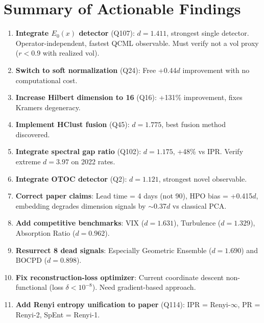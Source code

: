 \documentclass[11pt,a4paper]{article}
\begin{document}
\section{Summary of Actionable Findings}

\begin{enumerate}
\item \textbf{Integrate $E_0(x)$ detector} (Q107): $d=1.411$, strongest single detector. Operator-independent, fastest QCML observable. Must verify not a vol proxy ($r < 0.9$ with realized vol).
\item \textbf{Switch to soft normalization} (Q24): Free +0.44$d$ improvement with no computational cost.
\item \textbf{Increase Hilbert dimension to 16} (Q16): +131\% improvement, fixes Kramers degeneracy.
\item \textbf{Implement HClust fusion} (Q45): $d=1.775$, best fusion method discovered.
\item \textbf{Integrate spectral gap ratio} (Q102): $d=1.175$, +48\% vs IPR. Verify extreme $d=3.97$ on 2022 rates.
\item \textbf{Integrate OTOC detector} (Q2): $d=1.121$, strongest novel observable.
\item \textbf{Correct paper claims}: Lead time = 4 days (not 90), HPO bias = +0.415$d$, embedding degrades dimension signals by $\sim$0.37$d$ vs classical PCA.
\item \textbf{Add competitive benchmarks}: VIX ($d=1.631$), Turbulence ($d=1.329$), Absorption Ratio ($d=0.962$).
\item \textbf{Resurrect 8 dead signals}: Especially Geometric Ensemble ($d=1.690$) and BOCPD ($d=0.898$).
\item \textbf{Fix reconstruction-loss optimizer}: Current coordinate descent non-functional (loss $\delta < 10^{-8}$). Need gradient-based approach.
\item \textbf{Add Renyi entropy unification to paper} (Q114): IPR = Renyi-$\infty$, PR = Renyi-2, SpEnt = Renyi-1.
\end{enumerate}
\end{document}
